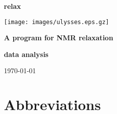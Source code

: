 \documentclass[a4paper, 11pt, twoside, openright]{book}
\begin{document}
\frontmatter



\begin{titlepage}
\begin{center}


{\Huge \textbf{relax}}

{\LARGE \textbf{}}

\centerline{\texttt{[image: images/ulysses.eps.gz]}}

{\huge \textbf{A program for NMR relaxation}}

{\huge \textbf{data analysis}}

{\large \today}

\end{center}
\end{titlepage}



\tableofcontents



\listoffigures






\chapter*{Abbreviations}
\end{document}
